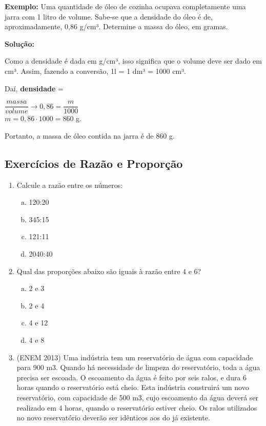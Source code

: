\begin{multicols*}{2}
\begin{enumerate}[wide, labelwidth=!, labelindent=0pt]
		      \textbf{Exemplo:} Uma quantidade de óleo de cozinha ocupava completamente uma jarra com 1 litro de volume. Sabe-se que a densidade do óleo é de, aproximadamente, 0,86 g/cm³.  Determine a massa do óleo, em gramas.

		      \textbf{Solução:}

		      Como a densidade é dada em g/cm³, isso significa que o volume deve ser dado em cm³. Assim, fazendo a conversão, 1l = 1 dm³ = 1000 cm³.

		      Daí, \textbf{densidade} =

			      { $ \dfrac{massa}{volume} \to 0,86 = \dfrac{m}{1000} $}\\

		      {$ m = 0,86 \cdot 1000 = 860 $ g}.

		      Portanto, a massa de óleo contida na jarra é de 860 g.

	\end{enumerate}

	\subsection*{Exercícios de Razão e Proporção}

	\begin{enumerate}[wide, labelwidth=!, labelindent=0pt]

		\item Calcule a razão entre os números:
		      \begin{enumerate}[(a)]
			      \item 120:20
			      \item 345:15
			      \item 121:11
			      \item 2040:40
		      \end{enumerate}

		\item Qual das proporções abaixo são iguais à razão entre 4 e 6?
		      \begin{enumerate}[(a)]
			      \item 2 e 3
			      \item 2 e 4
			      \item 4 e 12
			      \item 4 e 8
		      \end{enumerate}

		\item (ENEM 2013) Uma indústria tem um reservatório de água com capacidade para 900 m3. Quando há necessidade de limpeza do reservatório, toda a água precisa ser escoada. O escoamento da água é feito por seis ralos, e dura 6 horas quando o reservatório está cheio. Esta indústria construirá um novo reservatório, com capacidade de 500 m3, cujo escoamento da água deverá ser realizado em 4 horas, quando o reservatório estiver cheio. Os ralos utilizados no
		      novo reservatório deverão ser idênticos aos do já existente.


\end{enumerate}
\end{multicols*}
